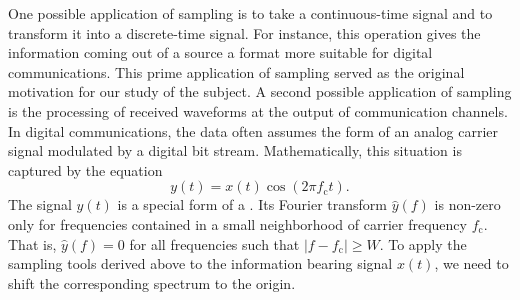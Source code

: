 One possible application of sampling is to take a continuous-time signal and to transform it into a discrete-time signal.
For instance, this operation gives the information coming out of a source a format more suitable for digital communications.
This prime application of sampling served as the original motivation for our study of the subject.
A second possible application of sampling is the processing of received waveforms at the output of communication channels.
In digital communications, the data often assumes the form of an analog carrier signal modulated by a digital bit stream.
Mathematically, this situation is captured by the equation
\begin{equation*}
y(t) = x(t) \cos (2 \pi f_{\mathrm{c}} t) .
\end{equation*}
The signal $y(t)$ is a special form of a .
Its Fourier transform $\hat{y}(f)$ is non-zero only for frequencies contained in a small neighborhood of carrier frequency $f_{\mathrm{c}}$.
That is, $\hat{y}(f) = 0$ for all frequencies such that $|f - f_{\mathrm{c}}| \geq W$.
To apply the sampling tools derived above to the information bearing signal $x(t)$, we need to shift the corresponding spectrum to the origin.

